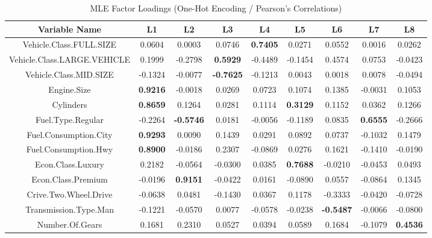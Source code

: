 \documentclass[11pt]{article}
\begin{document}
\begin{table}[ht!]
\centering
\small
\begin{tabular}{c | c c c c c c c c} 
\hline
Variable Name               &  L1 &  L2 &  L3 &  L4 &   L5 &  L6 & L7 & L8\\
\hline
Vehicle.Class.FULL.SIZE    &  0.0604 &  0.0003 &  0.0746 &  \textbf{0.7405} &  0.0271 &  0.0552 & 0.0016 &  0.0262\\
Vehicle.Class.LARGE.VEHICLE&  0.1999 & -0.2798 &  \textbf{0.5929} & -0.4489 & -0.1454 &  0.4574 & 0.0753 & -0.0423\\
Vehicle.Class.MID.SIZE     & -0.1324 & -0.0077 & \textbf{-0.7625} & -0.1213 &  0.0043 &  0.0018 & 0.0078 & -0.0494\\
Engine.Size                &  \textbf{0.9216} & -0.0018 &  0.0269 &  0.0723 &  0.1074 &  0.1385 &-0.0031 &  0.1053\\
Cylinders                  &  \textbf{0.8659} &  0.1264 &  0.0281 &  0.1114 &  \textbf{0.3129} &  0.1152 & 0.0362 &  0.1266\\
Fuel.Type.Regular          & -0.2264 & \textbf{-0.5746} &  0.0181 & -0.0056 & -0.1189 &  0.0835 & \textbf{0.6555} & -0.2666\\
Fuel.Consumption.City      &  \textbf{0.9293} &  0.0090 &  0.1439 &  0.0291 &  0.0892 &  0.0737 &-0.1032 &  0.1479\\
Fuel.Consumption.Hwy       &  \textbf{0.8900} & -0.0186 &  0.2307 & -0.0869 &  0.0276 &  0.1621 &-0.1410 & -0.0190\\
Econ.Class.Luxury          &  0.2182 & -0.0564 & -0.0300 &  0.0385 &  \textbf{0.7688} & -0.0210 &-0.0453 &  0.0493\\
Econ.Class.Premium         & -0.0196 &  \textbf{0.9151} & -0.0422 &  0.0161 & -0.0890 &  0.0557 &-0.0864 &  0.1345\\
Crive.Two.Wheel.Drive      & -0.0638 &  0.0481 & -0.1430 &  0.0367 &  0.1178 & -0.3333 &-0.0420 & -0.0728\\
Transmission.Type.Man      & -0.1221 & -0.0570 &  0.0077 & -0.0578 & -0.0238 & \textbf{-0.5487} &-0.0066 & -0.0800\\
Number.Of.Gears            &  0.1681 &  0.2310 &  0.0527 &  0.0394 &  0.0589 &  0.1684 &-0.1079 &  \textbf{0.4536}\\
\hline  
\end{tabular}
\caption{MLE Factor Loadings (One-Hot Encoding / Pearson's Correlations)}
\end{table}
\end{document}
